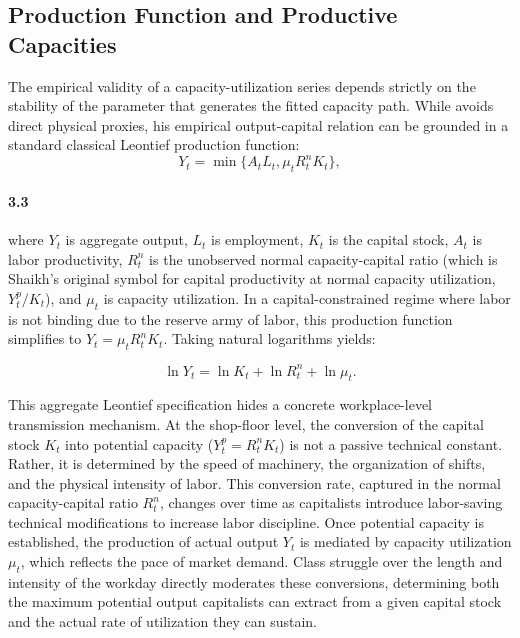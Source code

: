 \subsection{Production Function and Productive Capacities}
\label{subsec:coefficient_capacity_path}The empirical validity of a capacity-utilization series depends strictly on the stability of the parameter that generates the fitted capacity path. While \citet{Shaikh2016} avoids direct physical proxies, his empirical output-capital relation can be grounded in a standard classical Leontief production function:
\begin{equation}
Y_t = \min \{ A_t L_t, \mu_t R^n_t K_t \},
\end{equation}
\paragraph{3.3}
where $Y_t$ is aggregate output, $L_t$ is employment, $K_t$ is the capital stock, $A_t$ is labor productivity, $R^n_t$ is the unobserved normal capacity-capital ratio (which is Shaikh's original symbol for capital productivity at normal capacity utilization, $Y^p_t / K_t$), and $\mu_t$ is capacity utilization. In a capital-constrained regime where labor is not binding due to the reserve army of labor, this production function simplifies to $Y_t = \mu_t R^n_t K_t$. Taking natural logarithms yields:

\begin{equation}
\ln Y_t = \ln K_t + \ln R^n_t + \ln \mu_t.
\end{equation}

This aggregate Leontief specification hides a concrete workplace-level transmission mechanism. At the shop-floor level, the conversion of the capital stock $K_t$ into potential capacity ($Y^p_t = R^n_t K_t$) is not a passive technical constant. Rather, it is determined by the speed of machinery, the organization of shifts, and the physical intensity of labor. This conversion rate, captured in the normal capacity-capital ratio $R^n_t$, changes over time as capitalists introduce labor-saving technical modifications to increase labor discipline. Once potential capacity is established, the production of actual output $Y_t$ is mediated by capacity utilization $\mu_t$, which reflects the pace of market demand. Class struggle over the length and intensity of the workday directly moderates these conversions, determining both the maximum potential output capitalists can extract from a given capital stock and the actual rate of utilization they can sustain.

